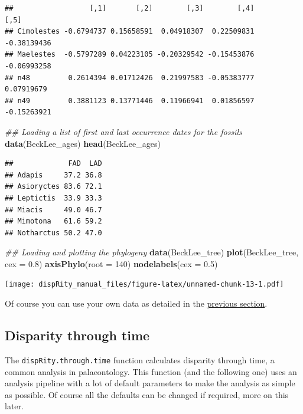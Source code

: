 \documentclass[]{book}
\newenvironment{Shaded}{\begin{snugshade}}{\end{snugshade}}
\newcommand{\CommentTok}[1]{\textcolor[rgb]{0.56,0.35,0.01}{\textit{#1}}}
\newcommand{\DataTypeTok}[1]{\textcolor[rgb]{0.13,0.29,0.53}{#1}}
\newcommand{\DecValTok}[1]{\textcolor[rgb]{0.00,0.00,0.81}{#1}}
\newcommand{\FloatTok}[1]{\textcolor[rgb]{0.00,0.00,0.81}{#1}}
\newcommand{\KeywordTok}[1]{\textcolor[rgb]{0.13,0.29,0.53}{\textbf{#1}}}
\newcommand{\NormalTok}[1]{#1}
\begin{document}
\begin{verbatim}
##                  [,1]       [,2]        [,3]        [,4]        [,5]
## Cimolestes -0.6794737 0.15658591  0.04918307  0.22509831 -0.38139436
## Maelestes  -0.5797289 0.04223105 -0.20329542 -0.15453876 -0.06993258
## n48         0.2614394 0.01712426  0.21997583 -0.05383777  0.07919679
## n49         0.3881123 0.13771446  0.11966941  0.01856597 -0.15263921
\end{verbatim}

\begin{Shaded}
\begin{Highlighting}[]
\CommentTok{## Loading a list of first and last occurrence dates for the fossils}
\KeywordTok{data}\NormalTok{(BeckLee_ages)}
\KeywordTok{head}\NormalTok{(BeckLee_ages)}
\end{Highlighting}
\end{Shaded}

\begin{verbatim}
##             FAD  LAD
## Adapis     37.2 36.8
## Asioryctes 83.6 72.1
## Leptictis  33.9 33.3
## Miacis     49.0 46.7
## Mimotona   61.6 59.2
## Notharctus 50.2 47.0
\end{verbatim}

\begin{Shaded}
\begin{Highlighting}[]
\CommentTok{## Loading and plotting the phylogeny}
\KeywordTok{data}\NormalTok{(BeckLee_tree)}
\KeywordTok{plot}\NormalTok{(BeckLee_tree, }\DataTypeTok{cex =} \FloatTok{0.8}\NormalTok{) }
\KeywordTok{axisPhylo}\NormalTok{(}\DataTypeTok{root =} \DecValTok{140}\NormalTok{)}
\KeywordTok{nodelabels}\NormalTok{(}\DataTypeTok{cex =} \FloatTok{0.5}\NormalTok{)}
\end{Highlighting}
\end{Shaded}

\texttt{[image: dispRity\_manual\_files/figure-latex/unnamed-chunk-13-1.pdf]}

Of course you can use your own data as detailed in the \protect\hyperlink{What-sort-of-data-does-dispRity-work-with}{previous section}.

\hypertarget{disparity-through-time}{%
\subsection{Disparity through time}\label{disparity-through-time}}

The \texttt{dispRity.through.time} function calculates disparity through time, a common analysis in palaeontology.
This function (and the following one) uses an analysis pipeline with a lot of default parameters to make the analysis as simple as possible.
Of course all the defaults can be changed if required, more on this later.
\end{document}
